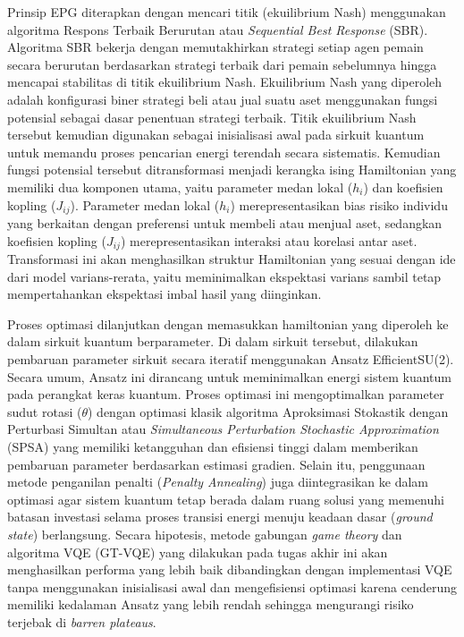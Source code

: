 Prinsip EPG diterapkan dengan mencari titik (ekuilibrium Nash) menggunakan algoritma Respons Terbaik Berurutan atau \textit{Sequential Best Response} (SBR). Algoritma SBR bekerja dengan memutakhirkan strategi setiap agen pemain secara berurutan berdasarkan strategi terbaik dari pemain sebelumnya hingga mencapai stabilitas di titik ekuilibrium Nash. Ekuilibrium Nash yang diperoleh adalah konfigurasi biner strategi beli atau jual suatu aset menggunakan fungsi potensial sebagai dasar penentuan strategi terbaik. Titik ekuilibrium Nash tersebut kemudian digunakan sebagai inisialisasi awal pada sirkuit kuantum untuk memandu proses pencarian energi terendah secara sistematis. Kemudian fungsi potensial tersebut ditransformasi menjadi kerangka ising Hamiltonian yang memiliki dua komponen utama, yaitu parameter medan lokal ($h_i$) dan koefisien kopling ($J_{ij}$). Parameter medan lokal ($h_i$) merepresentasikan bias risiko individu yang berkaitan dengan preferensi untuk membeli atau menjual aset, sedangkan koefisien kopling ($J_{ij}$) merepresentasikan interaksi atau korelasi antar aset. Transformasi ini akan menghasilkan struktur Hamiltonian yang sesuai dengan ide dari model varians-rerata, yaitu meminimalkan ekspektasi varians sambil tetap mempertahankan ekspektasi imbal hasil yang diinginkan.

Proses optimasi dilanjutkan dengan memasukkan hamiltonian yang diperoleh ke dalam sirkuit kuantum berparameter. Di dalam sirkuit tersebut, dilakukan pembaruan parameter sirkuit secara iteratif menggunakan Ansatz EfficientSU(2). Secara umum, Ansatz ini dirancang untuk meminimalkan energi sistem kuantum pada perangkat keras kuantum. Proses optimasi ini mengoptimalkan parameter sudut rotasi ($\theta$) dengan optimasi klasik algoritma Aproksimasi Stokastik dengan Perturbasi Simultan atau \textit{Simultaneous Perturbation Stochastic Approximation} (SPSA) yang memiliki ketangguhan dan efisiensi tinggi dalam memberikan pembaruan parameter berdasarkan estimasi gradien. Selain itu, penggunaan metode penganilan penalti (\textit{Penalty Annealing}) juga diintegrasikan ke dalam optimasi agar sistem kuantum tetap berada dalam ruang solusi yang memenuhi batasan investasi selama proses transisi energi menuju keadaan dasar (\textit{ground state}) berlangsung. Secara hipotesis, metode gabungan \textit{game theory} dan algoritma VQE (GT-VQE) yang dilakukan pada tugas akhir ini akan menghasilkan performa yang lebih baik dibandingkan dengan implementasi VQE tanpa menggunakan inisialisasi awal dan mengefisiensi optimasi karena cenderung memiliki kedalaman Ansatz yang lebih rendah sehingga mengurangi risiko terjebak di \textit{barren plateaus}.

